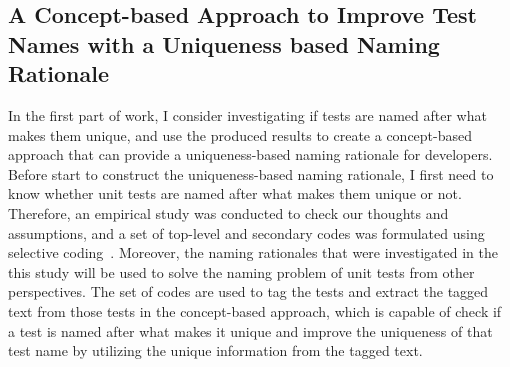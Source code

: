 \subsection{A Concept-based Approach to Improve Test Names with a Uniqueness based Naming Rationale}
\label{sec:unique-test-name}

In the first part of work, I consider investigating if tests are named after what makes them unique, and use the produced results to create a concept-based approach that can provide a uniqueness-based naming rationale for developers.
%
Before start to construct the uniqueness-based naming rationale, I first need to know whether unit tests are named after what makes them unique or not.
%
Therefore, an empirical study was conducted to check our thoughts and assumptions, and a set of top-level and secondary codes was formulated using selective coding~\cite{glaser1967discovery,strauss1998basics}.
%
Moreover, the naming rationales that were investigated in the this study will be used to solve the naming problem of unit tests from other perspectives.
%
The set of codes are used to tag the tests and extract the tagged text from those tests in the concept-based approach, which is capable of check if a test is named after what makes it unique and improve the uniqueness of that test name by utilizing the unique information from the tagged text.